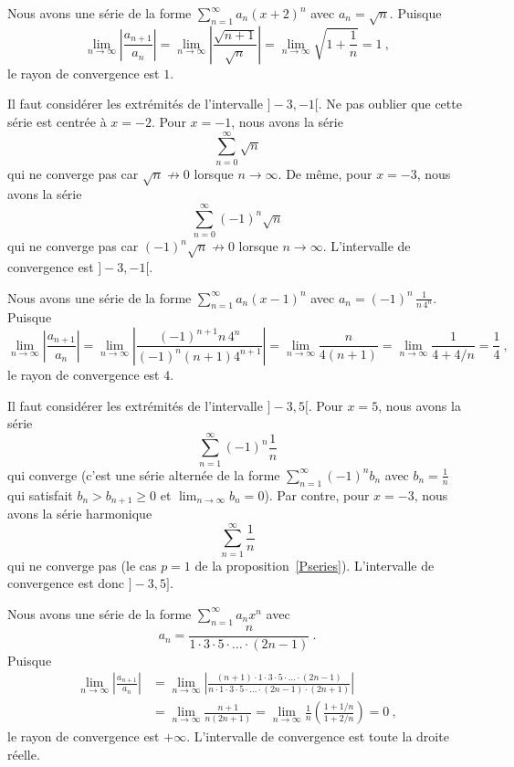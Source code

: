 { Nous avons une série de la forme
$\displaystyle \sum_{n=1}^\infty a_n (x+2)^n$ avec
$\displaystyle a_n = \sqrt{n}$.   Puisque
\[
\lim_{n\rightarrow \infty} \left| \frac{a_{n+1}}{a_n} \right| =
\lim_{n\rightarrow \infty} \left| \frac{\sqrt{n+1}}{\sqrt{n}} \right|
= \lim_{n\rightarrow \infty} \sqrt{1 + \frac{1}{n}}
= 1 \ ,
\]
le rayon de convergence est $1$.

Il faut considérer les extrémités de l'intervalle $]-3,-1[$.  Ne pas
oublier que cette série est centrée à $x = -2$.
Pour $x=-1$, nous avons la série
\[
\sum_{n=0}^\infty \sqrt{n}
\]
qui ne converge pas car $\sqrt{n} \not\to 0$ lorsque $n\to \infty$.
De même, pour $x=-3$, nous avons la série
\[
\sum_{n=0}^\infty (-1)^n \sqrt{n}
\]
qui ne converge pas car $(-1)^n\sqrt{n} \not\to 0$ lorsque $n\to \infty$.
L'intervalle de convergence est $]-3,-1[$.

 Nous avons une série de la forme
$\displaystyle \sum_{n=1}^\infty a_n (x-1)^n$ avec
$\displaystyle a_n = (-1)^n \,\frac{1}{n\,4^n}$.   Puisque
\[
\lim_{n\rightarrow \infty} \left| \frac{a_{n+1}}{a_n} \right| =
\lim_{n\rightarrow \infty} \left| \frac{(-1)^{n+1} n\, 4^n}
{(-1)^n (n+1) 4^{n+1}} \right|
= \lim_{n\rightarrow \infty} \frac{n}{4(n+1)}
= \lim_{n\rightarrow \infty} \frac{1}{4+4/n}
= \frac{1}{4} \ ,
\]
le rayon de convergence est $4$.

Il faut considérer les extrémités de l'intervalle $]-3,5[$.
Pour $x=5$, nous avons la série
\[
\sum_{n=1}^\infty (-1)^n \frac{1}{n}
\]
qui converge (c'est une série alternée de la forme
$\displaystyle \sum_{n=1}^\infty (-1)^n b_n$ avec
$\displaystyle b_n = \frac{1}{n}$ qui satisfait
$b_n > b_{n+1} \geq 0$ et $\displaystyle \lim_{n\rightarrow \infty} b_n = 0$). 
Par contre, pour $x= -3$, nous avons la série harmonique
\[
\sum_{n=1}^\infty \frac{1}{n}
\]
qui ne converge pas (le cas $p=1$ de la proposition~\ref{Pseries}). 
L'intervalle de convergence est donc $]-3,5]$.

 Nous avons une série de la forme
$\displaystyle \sum_{n=1}^\infty a_n x^n$ avec
\[
a_n =
\frac{n}{ 1 \cdot 3 \cdot 5 \cdot \ldots \cdot (2n-1)} \ .
\]
Puisque
\begin{align*}
\lim_{n\rightarrow \infty} \left| \frac{a_{n+1}}{a_n} \right| &=
\lim_{n\rightarrow \infty}
\left| \frac{(n+1) \cdot 1 \cdot 3 \cdot 5 \cdot \ldots \cdot (2n-1)}
{n \cdot 1 \cdot 3 \cdot 5 \cdot \ldots \cdot (2n-1) \cdot (2n+1) }
\right| \\
&= \lim_{n\rightarrow \infty} \frac{n+1}{n(2n+1)}
= \lim_{n\rightarrow \infty} \frac{1}{n} \left(\frac{1+1/n}{1+2/n}\right)
= 0 \ ,
\end{align*}
le rayon de convergence est $+\infty$.
L'intervalle de convergence est toute la droite réelle.

}
